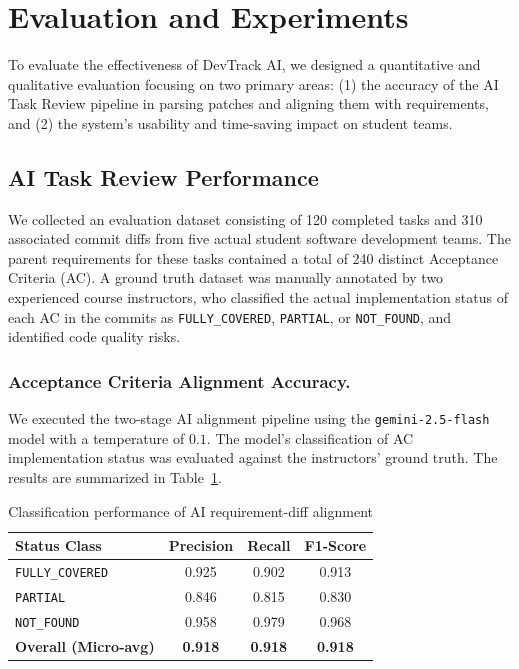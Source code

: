 \section{Evaluation and Experiments}
\label{sec:experiments}

To evaluate the effectiveness of DevTrack AI, we designed a quantitative and qualitative evaluation focusing on two primary areas: (1) the accuracy of the AI Task Review pipeline in parsing patches and aligning them with requirements, and (2) the system's usability and time-saving impact on student teams.

\subsection{AI Task Review Performance}

We collected an evaluation dataset consisting of 120 completed tasks and 310 associated commit diffs from five actual student software development teams. The parent requirements for these tasks contained a total of 240 distinct Acceptance Criteria (AC). A ground truth dataset was manually annotated by two experienced course instructors, who classified the actual implementation status of each AC in the commits as \texttt{FULLY\_COVERED}, \texttt{PARTIAL}, or \texttt{NOT\_FOUND}, and identified code quality risks.

\subsubsection{Acceptance Criteria Alignment Accuracy.}
We executed the two-stage AI alignment pipeline using the \texttt{gemini-2.5-flash} model with a temperature of $0.1$. The model's classification of AC implementation status was evaluated against the instructors' ground truth. The results are summarized in Table~\ref{tab:alignment_metrics}.

\begin{table}
\centering
\caption{Classification performance of AI requirement-diff alignment}
\label{tab:alignment_metrics}
\begin{tabular}{lccc}
\toprule
\textbf{Status Class} & \textbf{Precision} & \textbf{Recall} & \textbf{F1-Score} \\
\midrule
\texttt{FULLY\_COVERED} & 0.925 & 0.902 & 0.913 \\
\texttt{PARTIAL}       & 0.846 & 0.815 & 0.830 \\
\texttt{NOT\_FOUND}     & 0.958 & 0.979 & 0.968 \\
\midrule
\textbf{Overall (Micro-avg)} & \textbf{0.918} & \textbf{0.918} & \textbf{0.918} \\
\bottomrule
\end{tabular}
\end{table}

